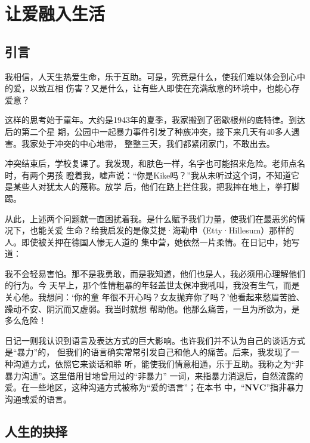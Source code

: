 \documentclass{ctexart}
\renewenvironment{quotation}{\setlength{\parskip}{0.5em}\setstretch{1.5}\kaishu\zihao{-5}\setlength{\parindent}{1em}}{\vspace{1em}}
\newcommand{\person}[1]{%
\nopagebreak{\raggedleft\small ------#1\par}}
\begin{document}
\newpage

\section*{让爱融入生活}

\subsection{引言}

我相信，人天生热爱生命，乐于互助。可是，究竟是什么，使我们难以体会到心中的爱，以致互相
伤害？又是什么，让有些人即使在充满敌意的环境中，也能心存爱意？

这样的思考始于童年。大约是1943年的夏季，我家搬到了密歇根州的底特律。到达后的第二个星
期，公园中一起暴力事件引发了种族冲突，接下来几天有40多人遇害。我家处于冲突的中心地带，
整整三天，我们都紧闭家门，不敢出去。

冲突结束后，学校复课了。我发现，和肤色一样，名字也可能招来危险。老师点名时，有两个男孩
瞪着我，嘘声说：``你是Kike吗？''我从未听过这个词，不知道它是某些人对犹太人的蔑称。放学
后，他们在路上拦住我，把我摔在地上，拳打脚踢。

从此，上述两个问题就一直困扰着我。是什么赋予我们力量，使我们在最恶劣的情况下，也能关爱
生命？给我启发的是像艾提·海勒申（Etty·Hillesum）那样的人。即使被关押在德国人惨无人道的
集中营，她依然一片柔情。在日记中，她写道：

\begin{quotation}
	我不会轻易害怕。那不是我勇敢，而是我知道，他们也是人，我必须用心理解他们的行为。今
	天早上，那个性情粗暴的年轻盖世太保冲我吼叫，我没有生气，而是关心他。我想问：`你的童
	年很不开心吗？女友抛弃你了吗？'他看起来愁眉苦脸、躁动不安、阴沉而又虚弱。我当时就想
	帮助他。他那么痛苦，一旦为所欲为，是多么危险！

	\person{艾提·海勒申}
\end{quotation}

日记一则我认识到语言及表达方式的巨大影响。也许我们并不认为自己的谈话方式是``暴力''的，
但我们的语言确实常常引发自己和他人的痛苦。后来，我发现了一种沟通方式，依照它来谈话和聆
听，能使我们情意相通，乐于互助。我称之为``非暴力沟通''。这里借用甘地曾用过的``非暴力''
一词，来指暴力消退后，自然流露的爱。在一些地区，这种沟通方式被称为``爱的语言''；在本书
中，``\textbf{NVC}''指非暴力沟通或爱的语言。

\subsection{人生的抉择}
\end{document}
